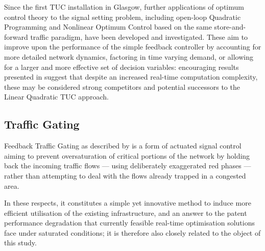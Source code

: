 Since the first TUC installation in Glasgow, further applications of optimum control
theory to the signal setting problem, including open-loop Quadratic Programming and
Nonlinear Optimum Control based on the same store-and-forward traffic paradigm, have been
developed and investigated. These aim to improve upon the performance of the simple
feedback controller by accounting for more detailed network dynamics, factoring in time
varying demand, or allowing for a larger and more effective set of decision variables:
encouraging results presented in \citep{diakaki2003extensions} suggest that despite an increased real-time computation complexity, these may be considered strong competitors and potential successors to the Linear Quadratic TUC approach.

\subsection{Traffic Gating}
\newcommand{\tts}[1]{\omega_{#1}^{\scriptscriptstyle{TTS}}}
\newcommand{\ttd}[1]{\omega_{#1}^{\scriptscriptstyle{TTD}}}

Feedback Traffic Gating as described by \cite{keyvan2012congestion} is a form of actuated signal control aiming to prevent oversaturation of critical portions of the network by holding back the incoming traffic flows — using deliberately exaggerated red phases — rather than attempting to deal with the flows already trapped in a congested area. 

In these respects, it constitutes a simple yet innovative method to induce more efficient utilisation of the existing infrastructure, and an answer to the patent performance degradation that currently feasible real-time optimisation solutions face under saturated conditions; it is therefore also closely related to the object of this study.


